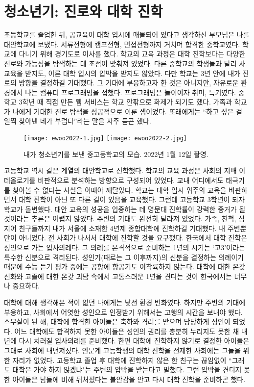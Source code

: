 \section*{청소년기: 진로와 대학 진학}

초등학교를 졸업한 뒤, 공교육이 대학 입시에 매몰되어 있다고 생각하신 부모님은 나를 대안학교에 보냈다. 서류전형에 캠프전형, 면접전형까지 거치며 합격한 중학교였다. 학교에 다니기 위해 경기도로 이사를 했다. 학교의 교육 과정은 대학 진학보다는 다양한 진로와 가능성을 탐색하는 데 초점이 맞춰져 있었다. 다른 중학교의 학생들과 달리 사교육을 받지도, 이른 대학 입시의 압박을 받지도 않았다. 다만 학교는 3년 안에 내가 진로의 방향을 결정하길 기대했다. 그 기대에 부응하고자 한 것은 아니지만, 자유로운 환경에서 나는 컴퓨터 프로그래밍을 접했다. 프로그래밍은 놀이이자 취미, 특기였다. 중학교 3학년 때 직접 만든 웹 서비스는 학교 안팎으로 화제가 되기도 했다. 가족과 학교가 나에게 기대한 진로 탐색을 성공적으로 이룬 셈이었다. 또래에게는 ``하고 싶은 걸 일찍 찾아낸 네가 부럽다''라는 말을 자주 듣곤 했다.

\begin{figure}[h]
  \centering
  \texttt{[image: ewoo2022-1.jpg]}
  \texttt{[image: ewoo2022-2.jpg]}
  \caption{내가 청소년기를 보낸 중고등학교의 모습. 2022년 1월 12일 촬영.}
\end{figure}

고등학교 역시 같은 계열의 대안학교로 진학했다. 학교의 교육 과정은 사회의 지배 이데올로기를 비판적으로 분석하는 방향으로 구성되어 있었다. 교내 어디에서도 태극기를 찾아볼 수 없다는 사실을 이때야 깨달았다. 학교는 대학 입시 위주의 교육을 비판하면서 대학 진학이 아닌 또 다른 길이 있음을 교육했다. 그런데 고등학교 3학년이 되자 학교가 돌변했다. 대안 교육의 성공을 입증하는 데 명문대 진학률이 강력한 증거가 될 것이라는 추론은 어렵지 않았다. 주변의 기대도 완전히 달라져 있었다. 가족, 친척, 심지어 친구들까지 내가 서울에 소재한 4년제 종합대학에 진학하길 기대했다. 내 주변뿐만이 아니었다. 전 사회가 나서서 대학에 진학할 것을 요구했다. 한국에서 대학 진학은 성인으로 가는 입사의례다. 그 의례를 본격적으로 준비하는 1년의 시기는 `고3'이라는 특수한 신분으로 격리된다. 성인기(때로는 그 이후까지)의 신분을 결정하는 의례이기 때문에 수능 듣기 평가 중에는 공항에 항공기도 이착륙하지 않는다. 대학에 대한 온갖 신화와 고졸에 대한 온갖 괴담 속에서 고통스러운 1년을 견디는 것이 한국에서는 너무나 중요하다.

대학에 대해 생각해본 적이 없던 나에게는 낯선 환경 변화였다. 하지만 주변의 기대에 부응하고, 사회에서 어엿한 성인으로 인정받기 위해서는 고행의 시간을 보내야 했다. 스무살이 된 해, 대학에 합격한 아이들은 축하와 격려를 받으며 당당하게 성인이 되었다. 어느 대학에도 합격하지 못한 아이들은 성인의 권리를 충분히 누리지도 못한 채 내년에 다시 치러질 입사의례를 준비했다. 한편 대학에 진학하지 않기로 결정한 아이들은 그대로 사회에 내던져졌다. 인문계 고등학생의 대학 진학을 전제한 사회에는 그들을 위한 자리가 없었다. 고등학교 졸업 후 대학에 진학하지 않은 한 친구는 끊임없이 ``그래도 대학은 가야 하지 않겠냐"는 주변의 압박을 받는다고 말했다. 그런 압박을 견디지 못한 아이들은 남들에 비해 뒤처졌다는 불안감을 안고 다시 대학 진학을 준비하곤 했다.


